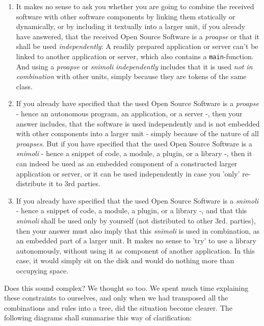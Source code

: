 \begin{enumerate}
  
  \item \label{InvalidFinderTokenCombinations}It makes no sense to ask you
  whether you are going to combine the received software with other software
  components by linking them statically or dynamically, or by including it
  textually into a larger unit, if you already have answered, that the received
  Open Source Software is a \emph{proapse} or that it shall be used
  \emph{independently}: A readily prepared application or server can't be linked
  to another application or server, which also contains a
  \texttt{main}-function. And using a \emph{proapse} or \emph{snimoli}
  \emph{independently} includes that it is used \emph{not in combination} with
  other units, simply because they are tokens of the same class.
  
  \item If you already have specified that the used Open Source Software is a
  \emph{proapse} - hence an autonomous program, an application, or a server -,
  then your answer includes, that the software is used independently and is not
  embedded with other components into a larger unit - simply because of the
  nature of all \emph{proapses}. But if you have specified that the used Open
  Source Software is a \emph{snimoli} - hence a snippet of code, a module, a
  plugin, or a library -, then it can indeed be used as an embedded component of
  a constructed larger application or server, or it can be used independently in
  case you 'only' re-distribute it to 3rd parties.
  
  \item If you already have specified that the used Open Source Software is a
  \emph{snimoli} - hence a snippet of code, a module, a plugin, or a library -,
  and that this \emph{snimoli} shall be used only by yourself (not distributed
  to other 3rd. parties), then your answer must also imply that this
  \emph{snimoli} is used in combination, as an embedded part of a larger unit.
  It makes no sense to 'try' to use a library autonomously, without using it
  as component of another application. In this case, it would simply sit on the
  disk and would do nothing more than occupying space.

\end{enumerate}

Does this sound complex? We thought so too. We spent much
time explaining these constraints to ourselves, and only when we had transposed
all the combinations and rules into a tree, did the situation become clearer.
The following diagrams shall summarise this way of clarification:

%
